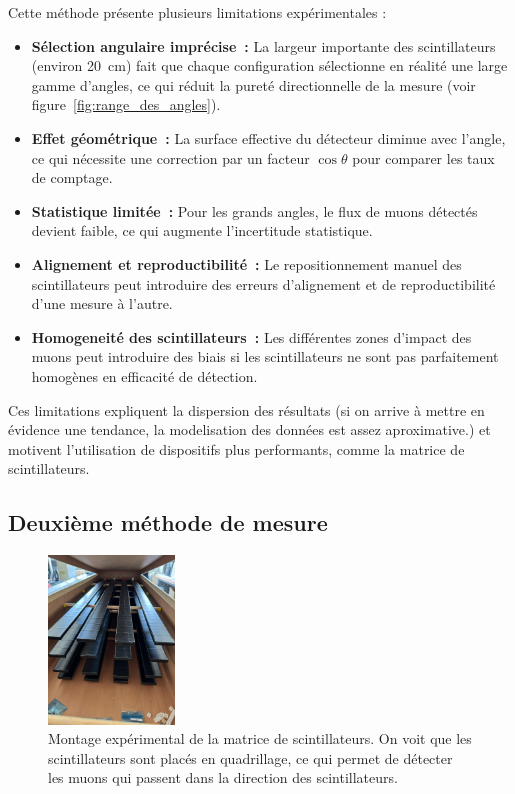 \documentclass[a4paper,12pt,twoside]{article}
\begin{document}
\begin{center}
\begin{tcolorbox}[colback=red!5!white, colframe=red!80!black, title=Limites et problèmes de la sélection angulaire par déplacement des scintillateurs]
Cette méthode présente plusieurs limitations expérimentales :
\begin{itemize}
    \item \textbf{Sélection angulaire imprécise~:} La largeur importante des scintillateurs (environ 20~cm) fait que chaque configuration sélectionne en réalité une large gamme d’angles, ce qui réduit la pureté directionnelle de la mesure (voir figure~\ref{fig:range_des_angles}).
    \item \textbf{Effet géométrique~:} La surface effective du détecteur diminue avec l’angle, ce qui nécessite une correction par un facteur $\cos\theta$ pour comparer les taux de comptage.
    \item \textbf{Statistique limitée~:} Pour les grands angles, le flux de muons détectés devient faible, ce qui augmente l’incertitude statistique.
    \item \textbf{Alignement et reproductibilité~:} Le repositionnement manuel des scintillateurs peut introduire des erreurs d’alignement et de reproductibilité d’une mesure à l’autre.
    \item \textbf{Homogeneité des scintillateurs~:} Les différentes zones d'impact des muons peut introduire des biais si les scintillateurs ne sont pas parfaitement homogènes en efficacité de détection.
  \end{itemize}
Ces limitations expliquent la dispersion des résultats (si on arrive à mettre en évidence une tendance, la modelisation des données est assez aproximative.) et motivent l’utilisation de dispositifs plus performants, comme la matrice de scintillateurs.
\end{tcolorbox}
\end{center}


\subsection{Deuxième méthode de mesure}


\begin{figure}[!h]
  \centering
  \includegraphics[width=0.3\textwidth]{Images/matrice_scint.jpg}
  \caption{Montage expérimental de la matrice de scintillateurs. On voit que les scintillateurs sont placés en quadrillage, ce qui permet de détecter les muons qui passent dans la direction des scintillateurs.}
  \label{fig:scintillateur}
\end{figure}
\end{document}
